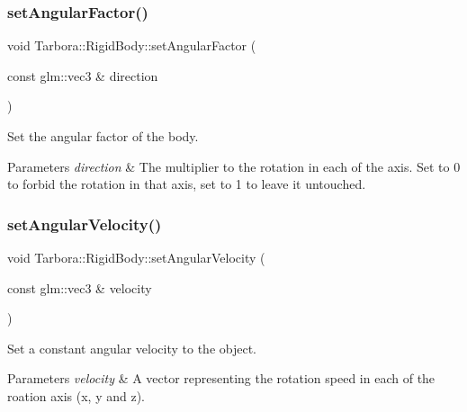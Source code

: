 \mbox{\label{classTarbora_1_1RigidBody_a2cc6295e8f2a6c9eaf88c037ee32aa4f}} 
\subsubsection{\texorpdfstring{set\+Angular\+Factor()}{setAngularFactor()}}
{\footnotesize\ttfamily void Tarbora\+::\+Rigid\+Body\+::set\+Angular\+Factor (\begin{DoxyParamCaption}\item[{const glm\+::vec3 \&}]{direction }\end{DoxyParamCaption})}



Set the angular factor of the body. 


\begin{DoxyParams}{Parameters}
{\em direction} & The multiplier to the rotation in each of the axis. Set to 0 to forbid the rotation in that axis, set to 1 to leave it untouched. \\
\hline
\end{DoxyParams}
\mbox{\label{classTarbora_1_1RigidBody_a895d8b8c01ee5c813d7f9d9df5dc08cd}} 
\subsubsection{\texorpdfstring{set\+Angular\+Velocity()}{setAngularVelocity()}}
{\footnotesize\ttfamily void Tarbora\+::\+Rigid\+Body\+::set\+Angular\+Velocity (\begin{DoxyParamCaption}\item[{const glm\+::vec3 \&}]{velocity }\end{DoxyParamCaption})}



Set a constant angular velocity to the object. 


\begin{DoxyParams}{Parameters}
{\em velocity} & A vector representing the rotation speed in each of the roation axis (x, y and z). \\
\hline
\end{DoxyParams}
\mbox{\label{classTarbora_1_1RigidBody_af6eb6a7aaf2eba4d1375ba40ca89bcdd}} 
